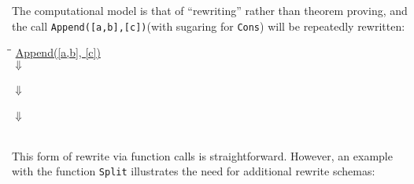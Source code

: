 The computational model is that of ``rewriting'' rather than theorem proving, and the call
\texttt{Append([a,b],[c])}(with sugaring for \texttt{Cons}) will be repeatedly rewritten:

\begin{ttfamily}
\begin{tabbing}
\hspace*{2cm}\=\hspace{2cm}\=\kill
\>\underline{Append([a,b], [c])}\\
\>\>$\Downarrow$\\
\\
\>\>$\Downarrow$\\
\\
\>\>$\Downarrow$\\
\>[a,b,c]\\
\end{tabbing}
\end{ttfamily}

This form of rewrite via function calls is straightforward.  However, an example with
the function \texttt{Split} illustrates the need for additional rewrite schemas:

